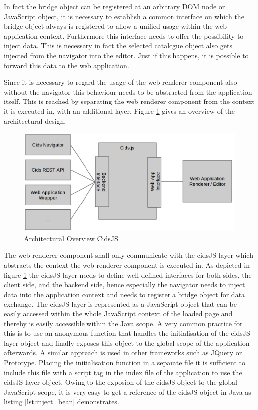 In fact the bridge object can be registered at an arbitrary DOM node or JavaScript object, it is necessary to establish a common interface on which the bridge object always is registered to allow a unified usage within the web application context.
Furthermore this interface needs to offer the possibility to inject data.
This is necessary in fact the selected catalogue object also gets injected from the navigator into the editor.
Just if this happens, it is possible to forward this data to the web application.

Since it is necessary to regard the usage of the web renderer component also without the navigator this  behaviour needs to be abstracted from the application itself.
This is reached by separating the web renderer component from the context it is executed in, with an additional layer.
Figure \ref{fig:cidsJS} gives an overview of the architectural design.

\begin{figure}
	\centering	\includegraphics[width=1.0\textwidth]{./img/impl/cidsJS.png}
	\caption{Architectural Overview CidsJS}
	\label{fig:cidsJS}
\end{figure}

The web renderer component shall only communicate with the cidsJS layer which abstracts the context the web renderer component is executed in.
As depicted in figure \ref{fig:cidsJS} the cidsJS layer needs to define well defined interfaces for both sides, the client side, and the backend side, hence especially the navigator needs to inject data into the application context and needs to register a bridge object for data exchange.
The cidsJS layer is represented as a JavaScript object that can be easily accessed within the whole JavaScript context of the loaded page and thereby is easily accessible within the Java scope.
A very common practice for this is to use an anonymous function that handles the initialisation of the cidsJS layer object and finally exposes this object to the global scope of the application afterwards. 
A similar approach is used in other frameworks such as JQuery or Prototype.
Placing the initialisation function in a separate file it is sufficient to include this file with a script tag in the index file of the application to use the cidsJS layer object.
Owing to the exposion of the cidsJS object to the global JavaScript scope, it is very easy to get a reference of the cidsJS object in Java as listing \ref{lst:inject_bean} demonstrates.
 

